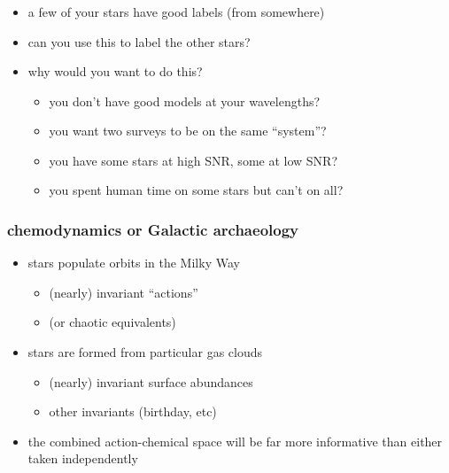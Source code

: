 \documentclass[pdftex]{beamer}
\begin{document}
\begin{frame}
  \frametitle{\tc}
  \begin{itemize}
  \item a few of your stars have good labels (from somewhere)
  \item can you use this to label the other stars?
  \item why would you want to do this?
    \begin{itemize}
    \item<2> you don't have good models at your wavelengths?
    \item<2> you want two surveys to be on the same ``system''?
    \item<2> you have some stars at high SNR, some at low SNR?
    \item<2> you spent human time on some stars but can't on all?
    \end{itemize}
  \end{itemize}
\end{frame}

\begin{frame}
  \frametitle{chemodynamics or Galactic archaeology}
  \begin{itemize}
  \item stars populate orbits in the Milky Way
    \begin{itemize}
    \item (nearly) invariant ``actions''
    \item (or chaotic equivalents)
    \end{itemize}
  \item stars are formed from particular gas clouds
    \begin{itemize}
    \item (nearly) invariant surface abundances
    \item other invariants (birthday, etc)
    \end{itemize}
  \item the combined action-chemical space will be far more
    informative than either taken independently
  \end{itemize}
\end{frame}
\end{document}
